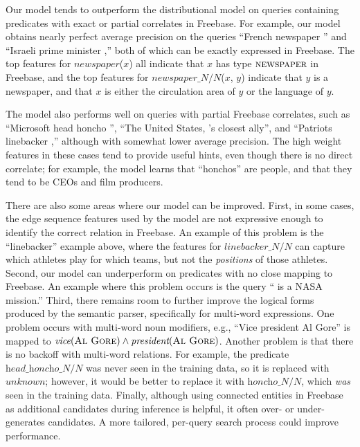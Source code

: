 \documentclass[11pt]{article}
\newcommand{\blank}{\underline{\hspace{.5cm}}}
\newcommand{\lexicalpredicate}[1]{\ensuremath{\textit{#1}}}
\newcommand{\formalpredicate}[1]{\ensuremath{\textsc{#1}}}
\newcommand{\entity}[1]{\ensuremath{\textsc{#1}}}
\begin{document}
Our model tends to outperform the distributional model on queries containing
predicates with exact or partial correlates in Freebase. For example, our model
obtains nearly perfect average precision on the queries ``French newspaper
\blank{}'' and ``Israeli prime minister \blank{},'' both of which can be
exactly expressed in Freebase.  The top features for
\lexicalpredicate{newspaper}($x$) all indicate that $x$ has type
\formalpredicate{newspaper} in Freebase, and the top features for
\lexicalpredicate{newspaper\_N/N}($x$, $y$) indicate that $y$ is a newspaper,
and that $x$ is either the circulation area of $y$ or the language of $y$.

The model also performs well on queries with partial Freebase correlates, such
as ``Microsoft head honcho \blank{}'', ``The United States, \blank{}'s closest
ally'', and ``Patriots linebacker \blank{},'' although with somewhat lower
average precision. The high weight features in these cases tend to provide
useful hints, even though there is no direct correlate; for example, the model
learns that ``honchos'' are people, and that they tend to be CEOs and film
producers.

There are also some areas where our model can be improved. First, in some
cases, the edge sequence features used by the model are not expressive enough
to identify the correct relation in Freebase. An example of this problem is the
``linebacker'' example above, where the features for
\lexicalpredicate{linebacker\_N/N} can capture which athletes play for which
teams, but not the \emph{positions} of those athletes. Second, our model can
underperform on predicates with no close mapping to Freebase. An example where
this problem occurs is the query ``\blank{} is a NASA mission.'' Third, there
remains room to further improve the logical forms produced by the semantic
parser, specifically for multi-word expressions. One problem occurs with
multi-word noun modifiers, e.g., ``Vice president Al Gore'' is mapped to
$\lexicalpredicate{vice}(\entity{Al Gore}) \land
\lexicalpredicate{president}(\entity{Al Gore})$. Another problem is that there
is no backoff with multi-word relations. For example, the predicate
\lexicalpredicate{head\_honcho\_N/N} was never seen in the training data, so it
is replaced with \lexicalpredicate{unknown}; however, it would be better to
replace it with \lexicalpredicate{honcho\_N/N}, which \emph{was} seen in the
training data. Finally, although using connected entities in Freebase as
additional candidates during inference is helpful, it often over- or
under-generates candidates. A more tailored, per-query search process could
improve performance.
\end{document}
